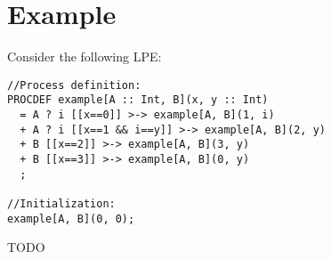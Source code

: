 \section{Example}

Consider the following LPE:

\begin{lstlisting}
//Process definition:
PROCDEF example[A :: Int, B](x, y :: Int)
  = A ? i [[x==0]] >-> example[A, B](1, i)
  + A ? i [[x==1 && i==y]] >-> example[A, B](2, y)
  + B [[x==2]] >-> example[A, B](3, y)
  + B [[x==3]] >-> example[A, B](0, y)
  ;

//Initialization:
example[A, B](0, 0);
\end{lstlisting}

TODO

